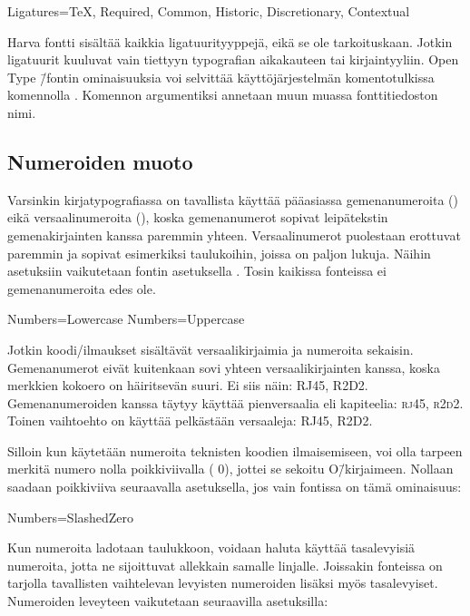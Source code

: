 \begin{koodilohkosis}
  Ligatures={TeX, Required, Common, Historic, Discretionary,
    Contextual}
\end{koodilohkosis}

Harva fontti sisältää kaikkia ligatuurityyppejä, eikä se ole
tarkoituskaan. Jotkin ligatuurit kuuluvat vain tiettyyn typografian
aikakauteen tai kirjaintyyliin. Open Type \=/fontin ominaisuuksia voi
selvittää käyttöjärjestelmän komentotulkissa komennolla
. Komennon argumentiksi annetaan muun muassa
fonttitiedoston nimi.

\subsection{Numeroiden muoto}
\label{luku:fontit_numerot}

Varsinkin kirjatypografiassa on tavallista käyttää pääasiassa
gemenanumeroita ({}) eikä versaalinumeroita
({}), koska gemenanumerot sopivat leipätekstin
gemenakirjainten kanssa paremmin yhteen. Versaalinumerot puolestaan
erottuvat paremmin ja sopivat esimerkiksi taulukoihin, joissa on paljon
lukuja. Näihin asetuksiin vaikutetaan fontin asetuksella
. Tosin kaikissa fonteissa ei gemenanumeroita edes ole.

\begin{koodilohkosis}
  Numbers=Lowercase %
  Numbers=Uppercase %
\end{koodilohkosis}

Jotkin koodi\-/ilmaukset sisältävät versaalikirjaimia ja numeroita
sekaisin. Gemenanumerot eivät kuitenkaan sovi yhteen versaalikirjainten
kanssa, koska merkkien koko\-ero on häiritsevän suuri. Ei siis näin:
RJ45, R2D2. Gemenanumeroiden kanssa täytyy käyttää pienversaalia eli
kapiteelia: \textsc{rj45}, \textsc{r2d2}. Toinen vaihtoehto on käyttää
pelkästään versaaleja: {\versaalinum RJ45, R2D2}.

Silloin kun käytetään numeroita teknisten koodien ilmaisemiseen, voi
olla tarpeen merkitä numero nolla poikkiviivalla
({ 0}), jottei se
sekoitu O\=/kirjaimeen. Nollaan saadaan poikkiviiva seuraavalla
asetuksella, jos vain fontissa on tämä ominaisuus:

\begin{koodilohkosis}
  Numbers=SlashedZero
\end{koodilohkosis}

Kun numeroita ladotaan taulukkoon, voidaan haluta käyttää tasalevyisiä
numeroita, jotta ne sijoittuvat allekkain samalle linjalle. Joissakin
fonteissa on tarjolla tavallisten vaihtelevan levyisten numeroiden
lisäksi myös tasalevyiset. Numeroiden leveyteen vaikutetaan seuraavilla
asetuksilla:

